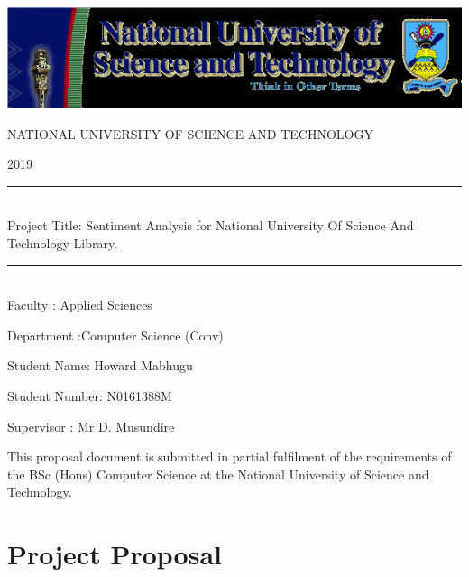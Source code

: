 \documentclass[12pt]{report}
\begin{document}
	\begin{titlepage}
		\centering
		\vspace*{0.5 cm}
		\includegraphics[scale=0.75]{nust.png}	%
		\begin{center}    \textsc{\Large   NATIONAL UNIVERSITY OF SCIENCE AND TECHNOLOGY}\\[2.0 cm]	\end{center}%
		\textsc{\Large 2019  }\\[0.5 cm]				%
		\rule{\linewidth}{0.2 mm} \\[0.4 cm] 
		Project Title: Sentiment Analysis for National University Of Science And Technology Library.
		\rule{\linewidth}{0.2 mm} \\[1.5 cm]
		
		
		Faculty : Applied Sciences 
		
		
		Department :Computer Science (Conv) 
		
		
		Student Name: Howard Mabhugu
		
		Student Number: N0161388M
		
		Supervisor : Mr D. Musundire
		
		
		
		\null
		This proposal document is submitted in partial fulfilment of the requirements of the BSc (Hons) Computer Science at the National University of Science  and Technology.
		
	\end{titlepage}
	
	
	\section{Project Proposal}
\end{document}
